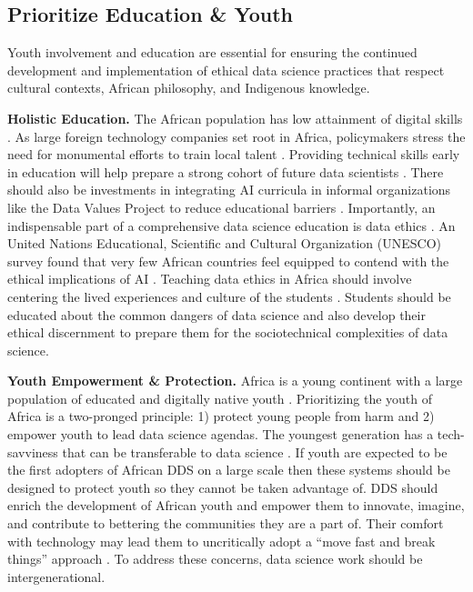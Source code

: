 \subsection{Prioritize Education \& Youth}
Youth involvement and education are essential for ensuring the continued development and implementation of ethical data science practices that respect cultural contexts, African philosophy, and Indigenous knowledge.

\textbf{Holistic Education.}
The African population has low attainment of digital skills \cite{okolo2023responsible, ade-ibijola2023artificial}. As large foreign technology companies set root in Africa, policymakers stress the need for monumental efforts to train local talent \cite{african_union2024continental,shilongo2023creativity, mhlambi2020from, cisse2018look}. Providing technical skills early in education will help prepare a strong cohort of future data scientists \cite{sinha2023principlesafrofeminist,nwankwo2019africa}. There should also be investments in integrating AI curricula in informal organizations like the Data Values Project to reduce educational barriers \cite{shilongo2023creativity}. 
Importantly, an indispensable part of a comprehensive data science education is data ethics \cite{goffi2023teaching, kiemde2022towards, ramose2004struggle}. An United Nations Educational, Scientific and Cultural Organization (UNESCO) survey found that very few African countries feel equipped to contend with the ethical implications of AI \cite{kiemde2022towards}. Teaching data ethics in Africa should involve centering the lived experiences and culture of the students \cite{goffi2023teaching,kiemde2022towards}. Students should be educated about the common dangers of data science and also develop their ethical discernment to prepare them for the sociotechnical complexities of data science.  


\textbf{Youth Empowerment \& Protection.}
Africa is a young continent with a large population of educated and digitally native youth \cite{nwankwo2019africa, goffi2023teaching}. 
Prioritizing the youth of Africa is a two-pronged principle: 1) protect young people from harm and 2) empower youth to lead data science agendas. 
The youngest generation has a tech-savviness that can be transferable to data science \cite{african_union2024continental,birhane2020algorithmic,abebe2021narratives}. 
If youth are expected to be the first adopters of African DDS on a large scale then these systems should be designed to protect youth so they cannot be taken advantage of. DDS should enrich the development of African youth and empower them to innovate, imagine, and contribute to bettering the communities they are a part of. 
Their comfort with technology may lead them to uncritically adopt a ``move fast and break things'' approach \cite{abebe2021narratives, ruttkampbloem2023epistemic}. To address these concerns, data science work should be intergenerational. 
